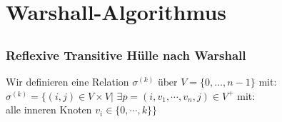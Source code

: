 \section{Warshall-Algorithmus}
\subsection*{}
\begin{frame}
	\frametitle{Reflexive Transitive Hülle nach Warshall}
	Wir definieren eine Relation $\sigma^{(k)}$ über $V=\{0,\dots,n-1\}$ mit:
		$\sigma^{(k)} = \{(i,j) \in V \times V |$
    $ \exists p = (i, v_1, \cdots, v_n, j) \in V^+$ mit:\\
    \hfill alle inneren Knoten $v_i \in \{0, \cdots, k\}\}$

	\begin{columns}
\end{columns}
\end{frame}
